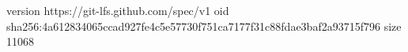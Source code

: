 version https://git-lfs.github.com/spec/v1
oid sha256:4a612834065ccad927fe4c5e57730f751ca7177f31c88fdae3baf2a93715f796
size 11068
